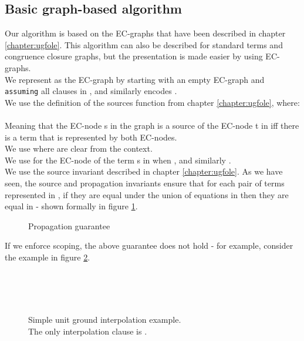 \subsection{Basic graph-based algorithm}
Our algorithm is based on the EC-graphs that have been described in chapter \ref{chapter:ugfole}. This algorithm can also be described for standard terms and congruence closure graphs, but the presentation is made easier by using EC-graphs.\\
We represent  as the EC-graph  by starting with an empty EC-graph and \lstinline{assuming} all clauses in ,
and similarly  encodes .\\
We use the definition of the sources function from chapter \ref{chapter:ugfole}, where: \\
\\
Meaning that the EC-node s in the graph  is a source of the EC-node t in  iff there is a term that is represented by both EC-nodes.\\
We use  where  are clear from the context.\\
We use  for the EC-node of the term s in  when , and similarly .\\
We use the source invariant described in chapter \ref{chapter:ugfole}. As we have seen, the source and propagation invariants ensure that for each pair of terms represented in , if they are equal under the union of equations in  then they are equal in  - shown formally in figure \ref{fig_propagation_guarantee}.

\begin{figure}
\caption{Propagation guarantee}
\label{fig_propagation_guarantee}
\end{figure}

If we enforce scoping, the above guarantee does not hold - for example, consider the example in figure \ref{example_4.2.1.1_0}.

\begin{figure}
\\
\\
\\
\caption{Simple unit ground interpolation example.\\
The only interpolation clause is .}
\label{example_4.2.1.1_0}
\end{figure}

